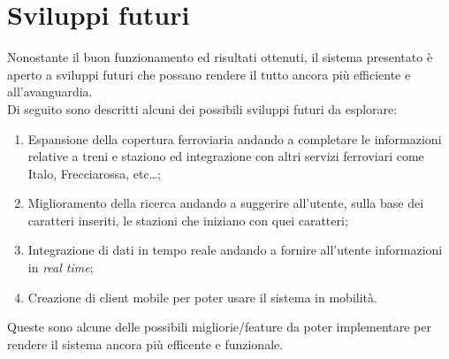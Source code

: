 \documentclass[italian,12pt,a4paper]{article}
\begin{document}
	
	\section{Sviluppi futuri}
	Nonostante il buon funzionamento ed risultati ottenuti, il sistema presentato è aperto a sviluppi futuri che possano rendere il tutto ancora più efficiente e all'avanguardia. \\
	\linebreak
	Di seguito sono descritti alcuni dei possibili sviluppi futuri da esplorare:
	
	\begin{enumerate}
		\item Espansione della copertura ferroviaria andando a completare le informazioni relative a treni e staziono ed integrazione con altri servizi ferroviari come Italo, Frecciarossa, etc\dots;
		\item Miglioramento della ricerca andando a suggerire all'utente, sulla base dei caratteri inseriti, le stazioni che iniziano con quei caratteri;
		\item Integrazione di dati in tempo reale andando a fornire all'utente informazioni in \textit{real time};
		\item Creazione di client mobile per poter usare il sistema in mobilità.
	\end{enumerate}
	Queste sono alcune delle possibili migliorie/feature da poter implementare per rendere il sistema ancora più efficente e funzionale.
	\printbibliography
	
\end{document}
